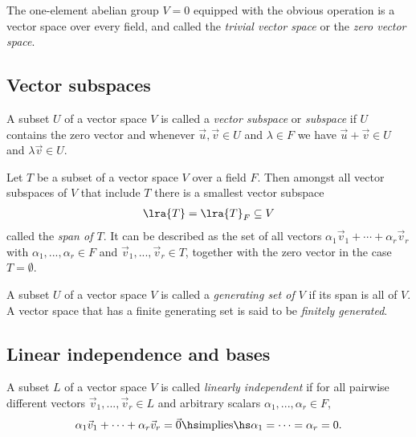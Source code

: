 \documentclass{article}
\begin{document}
\begin{definition}
    The one-element abelian group $V=0$ equipped with the
    obvious operation is a vector space over every field, and called the
    \emph{trivial vector space} or the \emph{zero vector space}.
\end{definition}

\subsection{Vector subspaces}

\begin{definition}
    A subset $U$ of a vector space $V$ is called a \emph{vector subspace} or
    \emph{subspace} if $U$ contains the zero vector and whenever $\vec u,\vec v\in U$
    and $\lambda\in F$ we have $\vec u + \vec v\in U$ and $\lambda\vec v\in U$.
\end{definition}

\begin{proposition}[Notes 1.4.5]
    Let $T$ be a subset of a vector space $V$ over a field $F$. Then amongst all
    vector subspaces of $V$ that include $T$ there is a smallest vector subspace
    \begin{align*}
        \lra{T} = \lra{T}_F\subseteq V
    \end{align*}
    called the \emph{span of $T$}.
    It can be described as the set of all vectors $\alpha_1\vec v_1+\cdots+\alpha_r\vec v_r$
    with $\alpha_1,...,\alpha_r\in F$ and $\vec v_1,...,\vec v_r\in T$, together
    with the zero vector in the case $T=\emptyset$.
\end{proposition}

\begin{definition}
    A subset $U$ of a vector space $V$ is called a \emph{generating set of $V$}
    if its span is all of $V$. A vector space that has a finite generating set
    is said to be \emph{finitely generated}.
\end{definition}

\subsection{Linear independence and bases}

\begin{definition}
    A subset $L$ of a vector space $V$ is called \emph{linearly independent}
    if for all pairwise different vectors $\vec v_1,...,\vec v_r\in L$ and
    arbitrary scalars $\alpha_1,...,\alpha_r\in F$,
    \begin{align*}
        \alpha_1\vec v_1+\cdots+\alpha_r\vec v_r = \vec 0
        \hs\text{implies}\hs
        \alpha_1=\cdots=\alpha_r=0.
    \end{align*}
\end{definition}
\end{document}
